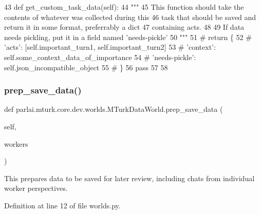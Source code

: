 \begin{DoxyCode}
43     \textcolor{keyword}{def }get\_custom\_task\_data(self):
44         \textcolor{stringliteral}{"""}
45 \textcolor{stringliteral}{        This function should take the contents of whatever was collected during this}
46 \textcolor{stringliteral}{        task that should be saved and return it in some format, preferrably a dict}
47 \textcolor{stringliteral}{        containing acts.}
48 \textcolor{stringliteral}{}
49 \textcolor{stringliteral}{        If data needs pickling, put it in a field named 'needs-pickle'}
50 \textcolor{stringliteral}{        """}
51         \textcolor{comment}{# return \{}
52         \textcolor{comment}{#     'acts': [self.important\_turn1, self.important\_turn2]}
53         \textcolor{comment}{#     'context': self.some\_context\_data\_of\_importance}
54         \textcolor{comment}{#     'needs-pickle': self.json\_incompatible\_object}
55         \textcolor{comment}{# \}}
56         \textcolor{keywordflow}{pass}
57 
58 
\end{DoxyCode}
\mbox{\label{classparlai_1_1mturk_1_1core_1_1dev_1_1worlds_1_1MTurkDataWorld_ab37222b5a1e607c5f8f301de880241f2}} 
\subsubsection{\texorpdfstring{prep\+\_\+save\+\_\+data()}{prep\_save\_data()}}
{\footnotesize\ttfamily def parlai.\+mturk.\+core.\+dev.\+worlds.\+M\+Turk\+Data\+World.\+prep\+\_\+save\+\_\+data (\begin{DoxyParamCaption}\item[{}]{self,  }\item[{}]{workers }\end{DoxyParamCaption})}

\begin{DoxyVerb}This prepares data to be saved for later review, including chats from individual
worker perspectives.
\end{DoxyVerb}
 

Definition at line 12 of file worlds.\+py.


